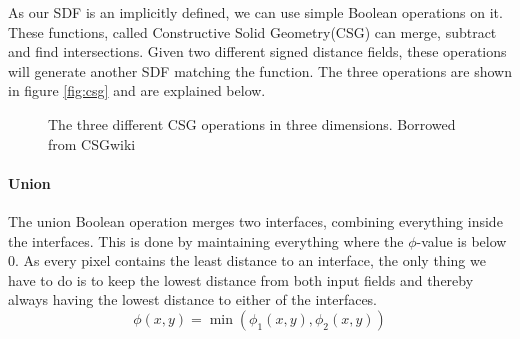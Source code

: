 As our SDF is an implicitly defined, we can use simple Boolean
operations on it. These functions, called Constructive Solid
Geometry(CSG) can merge, subtract and find intersections. Given two
different signed distance fields, these operations will generate
another SDF matching the function. The three operations are shown in figure \vref{fig:csg} and are explained below.

\begin{figure}[h]
  \centering
  \caption{The three different CSG operations in three dimensions. Borrowed from CSGwiki}

  \label{fig:csg}
\end{figure}


\paragraph{Union}
The union Boolean operation merges two interfaces, combining
everything inside the interfaces. This is done by maintaining
everything where the $\phi$-value is below 0. As every pixel contains
the least distance to an interface, the only thing we have to do is to
keep the lowest distance from both input fields and thereby always
having the lowest distance to either of the interfaces.
\begin{equation}
\phi(x,y) = \min(\phi_1(x,y),\phi_2(x,y))
\end{equation}

